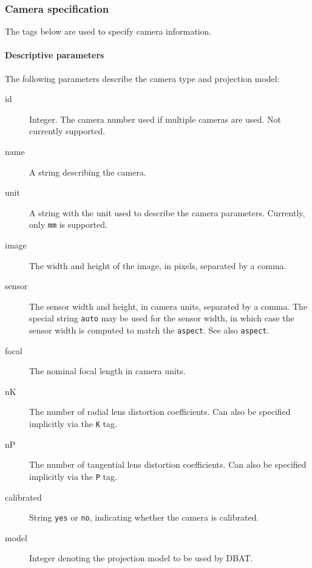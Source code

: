 \documentclass{article}
\begin{document}
\subsubsection{Camera specification}
\label{sec:camSpec}
The tags below are used to specify camera information. 
\paragraph{Descriptive parameters}
\label{sec:org761e96f}
The following parameters describe the camera type and projection
model:
\begin{description}
\item[{id}] Integer. The camera number used if multiple cameras are used.
Not currently supported.
\item[{name}] A string describing the camera.
\item[{unit}] A string with the unit used to describe the camera
parameters. Currently, only \texttt{mm} is supported.
\item[{image}] The width and height of the image, in pixels, separated by
a comma.
\item[{sensor}] The sensor width and height, in camera units, separated by
a comma. The special string \texttt{auto} may be used for the
sensor width, in which case the sensor width is computed
to match the \texttt{aspect}. See also \texttt{aspect}.
\item[{focal}] The nominal focal length in camera units.
\item[{nK}] The number of radial lens distortion coefficients. Can also be
specified implicitly via the \texttt{K} tag.
\item[{nP}] The number of tangential lens distortion coefficients. Can
also be specified implicitly via the \texttt{P} tag.
\item[{calibrated}] String \texttt{yes} or \texttt{no}, indicating whether the camera
is calibrated.
\item[{model}] Integer denoting the  projection model to be used by DBAT.
\end{description}
\end{document}
